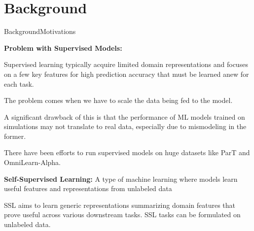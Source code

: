 \documentclass[10pt]{beamer}
\let\olditemize\itemize
\let\endolditemize\enditemize
\renewenvironment{itemize}{
  \olditemize[<+->] %
}{\endolditemize}
\begin{document}
\section{Background}
\begin{frame}{Background}{Motivations}

  \textbf{Problem with Supervised Models:}

  \begin{itemize}
    \item Supervised learning typically acquire limited domain representations and focuses on a few key features for
    high prediction accuracy that must be learned anew for each task.

    \item The problem comes when we have to scale the data being fed to the model.

  \item A significant drawback of this is that the performance of ML models trained on simulations
    may not translate to real data, especially due to mismodeling in the former.

    \item There have been efforts to run supervised models on huge datasets like ParT and
    OmniLearn-Alpha.

  \end{itemize}

  \textbf{Self-Supervised Learning:} A type of machine learning where models learn useful features and
  representations from unlabeled data

SSL aims to learn generic representations summarizing domain features that prove
useful across various downstream tasks. SSL tasks can be formulated on
unlabeled data.

\end{frame}
\end{document}
